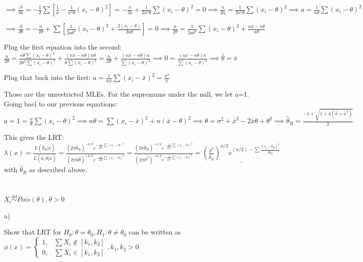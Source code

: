 \documentclass{article}
\let\Oldsum=\sum
\renewcommand{\sum}{\Oldsum\limits}
\newcommand{\iiddist}{\overset{\mathrm{iid}}{\sim}}
\begin{document}
$\implies \frac{\partial}{\partial a} = -\frac{1}{2}\sum[\frac{1}{a} - \frac{1}{a^2\theta}(x_i - \theta)^2] = -\frac{n}{2a} + \frac{1}{2a^2 \theta}\sum(x_i - \theta)^2 = 0 \implies \frac{n}{2a} = \frac{1}{2a^2 \theta}\sum(x_i - \theta)^2 \implies a = \frac{1}{n\theta}\sum(x_i - \theta)^2$

$\implies \frac{\partial}{\partial \theta} = -\frac{n}{2\theta} + \sum[\frac{1}{2a\theta^2}(x_i-\theta)^2 + \frac{2(x_i - \theta)}{2a\theta}] = 0 \implies \frac{n}{2\theta} = \frac{1}{2a\theta^2}\sum(x_i - \theta)^2 + \frac{n\bar{x} - n\theta}{a\theta}$

Plug the first equation into the second: $\frac{n}{2\theta} = \frac{n\theta\sum(x_i - \theta)^2}{2\theta^2\sum(x_i - \theta)^2} + \frac{(n\bar{x} - n\theta)n\theta}{\theta\sum(x_i - \theta)^2} = \frac{n}{2\theta} + \frac{(n\bar{x} - n\theta)n}{\sum(x_i - \theta)^2} \implies 0 = \frac{(n\bar{x} - n\theta)n}{\sum(x_i - \theta)^2} \implies \hat{\theta} = \bar{x}$

Plug that back into the first: $a = \frac{1}{n\bar{x}}\sum(x_i - \bar{x})^2 = \frac{\sigma^2}{\bar{x}}$

Those are the unrestricted MLEs. For the supremums under the null, we let a=1. Going bacl to our previous equations: $a = 1 = \frac{n}{\theta}\sum(x_i - \theta)^2 \implies n\theta = \sum (x_i - \bar{x})^2 + n(\bar{x} - \theta)^2 \implies \theta = \sigma^2 + \bar{x}^2 - 2\bar{x}\theta + \theta^2 \implies \hat{\theta}_R = \frac{-1 + \sqrt{1 + 4(\hat{\sigma} + \bar{x}^2)}}{2}$

This gives the LRT: $\lambda(x) = \frac{L(\hat{\theta}_R|x)}{L(\hat{a},\hat{\theta}|x)} = \frac{(2\pi \hat{\theta}_R)^{-n/2}e^{-\frac{1}{2\hat{\theta}_R}\sum (x_i - \theta)^2}}{(2\pi \hat{a}\hat{\theta})^{-n/2}e^{-\frac{1}{2\hat{a}\hat{\theta}}\sum (x_i - \theta)^2}} = \frac{(2\pi \hat{\theta}_R)^{-n/2}e^{-\frac{1}{2\hat{\theta}_R}\sum (x_i - \theta)^2}}{(2\pi \hat{\sigma}^2)^{-n/2}e^{-\frac{1}{2\hat{\sigma}^2}\sum (x_i - \theta)^2}} = \underline{(\frac{\hat{\sigma}^2}{\hat{\theta}_R})^{n/2}e^{(n/2) - \sum\frac{(x_i - \hat{\theta}_R)^2}{2\hat{\theta}_R}}}$ with $\hat{\theta}_R$ as described above. 

\section{}

$X_i \iiddist Pois(\theta), \theta > 0$

a) 

Show that LRT for $H_0: \theta = \theta_0, H_1: \theta \neq \theta_0$ can be written as $\phi(x) = \begin{cases} 1, & \sum X_i \notin [k_1,k_2] \\ 0, & \sum X_i \in [k_1,k_2] \end{cases}, k_1, k_2 > 0$
\end{document}
